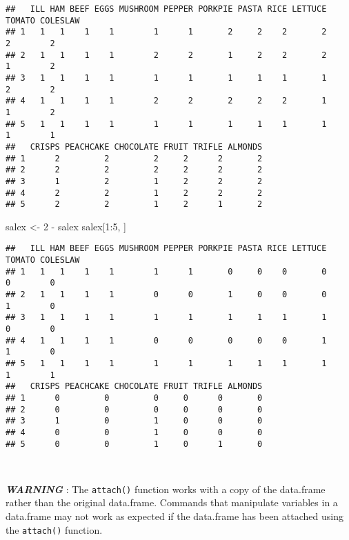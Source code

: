 \documentclass[
  12pt,
  a4paper]{book}
\newenvironment{Shaded}{\begin{snugshade}}{\end{snugshade}}
\newcommand{\DecValTok}[1]{\textcolor[rgb]{0.00,0.00,0.81}{#1}}
\newcommand{\NormalTok}[1]{#1}
\newcommand{\OtherTok}[1]{\textcolor[rgb]{0.56,0.35,0.01}{#1}}
\newcommand{\SpecialCharTok}[1]{\textcolor[rgb]{0.00,0.00,0.00}{#1}}
\begin{document}
\begin{verbatim}
##   ILL HAM BEEF EGGS MUSHROOM PEPPER PORKPIE PASTA RICE LETTUCE TOMATO COLESLAW
## 1   1   1    1    1        1      1       2     2    2       2      2        2
## 2   1   1    1    1        2      2       1     2    2       2      1        2
## 3   1   1    1    1        1      1       1     1    1       1      2        2
## 4   1   1    1    1        2      2       2     2    2       1      1        2
## 5   1   1    1    1        1      1       1     1    1       1      1        1
##   CRISPS PEACHCAKE CHOCOLATE FRUIT TRIFLE ALMONDS
## 1      2         2         2     2      2       2
## 2      2         2         2     2      2       2
## 3      1         2         1     2      2       2
## 4      2         2         1     2      2       2
## 5      2         2         1     2      1       2
\end{verbatim}

\begin{Shaded}
\begin{Highlighting}[]
\NormalTok{salex }\OtherTok{\textless{}{-}} \DecValTok{2} \SpecialCharTok{{-}}\NormalTok{ salex}
\NormalTok{salex[}\DecValTok{1}\SpecialCharTok{:}\DecValTok{5}\NormalTok{, ]}
\end{Highlighting}
\end{Shaded}

\begin{verbatim}
##   ILL HAM BEEF EGGS MUSHROOM PEPPER PORKPIE PASTA RICE LETTUCE TOMATO COLESLAW
## 1   1   1    1    1        1      1       0     0    0       0      0        0
## 2   1   1    1    1        0      0       1     0    0       0      1        0
## 3   1   1    1    1        1      1       1     1    1       1      0        0
## 4   1   1    1    1        0      0       0     0    0       1      1        0
## 5   1   1    1    1        1      1       1     1    1       1      1        1
##   CRISPS PEACHCAKE CHOCOLATE FRUIT TRIFLE ALMONDS
## 1      0         0         0     0      0       0
## 2      0         0         0     0      0       0
## 3      1         0         1     0      0       0
## 4      0         0         1     0      0       0
## 5      0         0         1     0      1       0
\end{verbatim}

~

\textbf{\emph{WARNING}} : The \texttt{attach()} function works with a copy of the data.frame rather than the original data.frame. Commands that manipulate variables in a data.frame may not work as expected if the data.frame has been attached using the \texttt{attach()} function.
\end{document}
